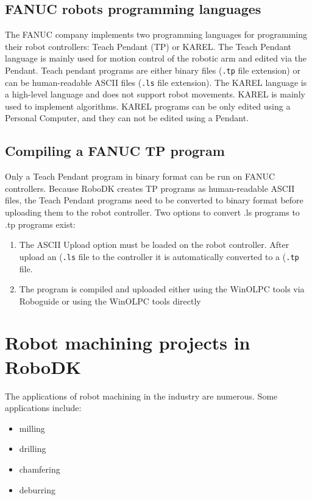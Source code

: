\subsection{FANUC robots programming languages}

The FANUC company implements two programming languages for programming their robot controllers: Teach Pendant (TP) or KAREL. The Teach Pendant language is mainly used for motion control of the robotic arm and edited via the Pendant. Teach pendant programs are either binary files (\texttt{.tp} file extension) or can be human-readable ASCII files (\texttt{.ls} file extension). The KAREL language is a high-level language and does not support robot movements. KAREL is mainly used to implement algorithms. KAREL programs can be only edited using a Personal Computer, and they can not be edited using a Pendant.

\subsection{Compiling a FANUC TP program}

Only a Teach Pendant program in binary format can be run on FANUC controllers. Because RoboDK creates TP programs as human-readable ASCII files, the Teach Pendant programs need to be converted to binary format before uploading them to the robot controller. Two options to convert .ls programs to .tp programs exist:

\begin{enumerate}
\item The ASCII Upload option must be loaded on the robot controller. After upload an (\texttt{.ls} file to the controller it is automatically converted to a (\texttt{.tp} file.
\item The program is compiled and uploaded either using the WinOLPC  tools via Roboguide or using the WinOLPC tools directly

\end{enumerate}

\section{Robot machining projects in RoboDK}

The applications of robot machining in the industry are numerous. Some applications include:

\begin{itemize}

    \item milling
    \item drilling
    \item chamfering
    \item deburring

\end{itemize}

